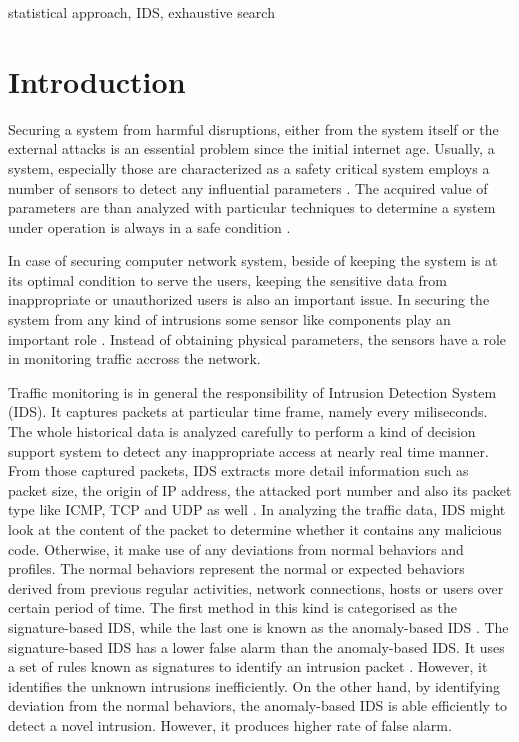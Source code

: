 \documentclass[conference,10pt,a4paper]{IEEEtran}
\begin{document}
\begin{keywords}
statistical approach, IDS, exhaustive search
\end{keywords}

\section{Introduction}
\label{sec:intro}

Securing a system from harmful disruptions, either from the system itself or the external attacks is an essential problem since the initial internet age. Usually, a system, especially those are characterized as a safety critical system employs a number of sensors to detect any influential parameters \cite{SciTopics, aircraftSafety, CarvalhoNormal, ftaOilTank, uncertainBondGraph, BjornesethMaritime}. The acquired value of parameters are than analyzed with particular techniques to determine a system under operation is always in a safe condition \cite{jamilAffandi,timeseriesNN,recurrentNN,CarlosPSO}.

In case of securing computer network system, beside of keeping the system is at its optimal condition to serve the users, keeping the sensitive data from inappropriate or unauthorized users is also an important issue. In securing the system from any kind of intrusions some sensor like components play an important role \cite{simmons2009avoidit}. Instead of obtaining physical parameters, the sensors have a role in monitoring traffic accross the network. 

Traffic monitoring is in general the responsibility of Intrusion Detection System (IDS). It captures packets at particular time frame, namely every miliseconds. The whole historical data is analyzed carefully to perform a kind of decision support system to detect any inappropriate access at nearly real time manner. From those captured packets, IDS extracts more detail information such as packet size, the origin of IP address, the attacked port number and also its packet type like ICMP, TCP and UDP as well \cite{AgarwalHybrid,snort}. In analyzing the traffic data, IDS might look at the content of the packet to determine whether it contains any malicious code. Otherwise, it make use of any deviations from normal behaviors and profiles. The normal behaviors represent the normal or expected behaviors derived from previous regular activities, network connections, hosts or users over certain period of time. The first method in this kind is categorised as the signature-based IDS, while the last one is known as the anomaly-based IDS \cite{idsReview}. The signature-based IDS has a lower false alarm than the anomaly-based IDS. It uses a set of rules known as signatures to identify an intrusion packet \cite{AdaBoost}. However, it identifies the unknown intrusions inefficiently. On the other hand, by identifying deviation from the normal behaviors, the anomaly-based IDS is able efficiently to detect a novel intrusion. However, it produces higher rate of false alarm.
\end{document}
